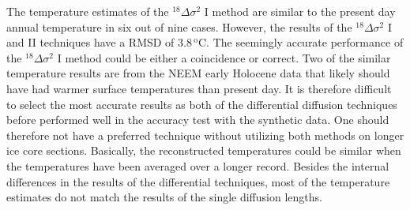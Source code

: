 \documentclass[11pt, draftcls, onecolumn]{IEEEtran} %
\numberwithin{equation}{section}
\numberwithin{table}{section}
\numberwithin{figure}{section}
\begin{document}
The temperature estimates of the ${}^{18}\Delta\sigma^2$ I method are similar to the present day annual temperature in six out of nine cases. 
However, the results of the ${}^{18}\Delta\sigma^2$ I and II techniques have a RMSD of $3.8\,^\mathrm{o}\mathrm{C}$.
The seemingly accurate performance of the ${}^{18}\Delta\sigma^2$ I method could be either a coincidence or correct. 
Two of the similar temperature results are from the NEEM early Holocene data that likely should have had warmer surface temperatures 
than present day.
It is therefore difficult to select the most accurate results as both of the differential diffusion techniques
before performed well in the accuracy test with the synthetic data.
One should therefore not have a preferred technique without utilizing both methods on longer ice core sections.
Basically, the reconstructed temperatures could be similar when the temperatures have been averaged over a longer record.
Besides the internal differences in the results of the differential techniques, most of the temperature estimates do not 
match the results of the single diffusion lengths.


\end{document}
